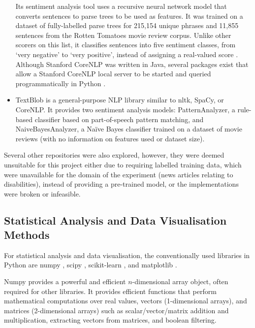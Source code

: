 \documentclass{report}
\begin{document}
\begin{itemize}
		Its sentiment analysis tool uses a recursive neural network model that converts sentences to parse trees to be used as features. 
		It was trained on a dataset of fully-labelled parse trees for 215,154 unique phrases and 11,855 sentences from the Rotten Tomatoes movie review corpus. 
		Unlike other scorers on this list, it classifies sentences into five sentiment classes, from `very negative' to `very positive', instead of assigning a real-valued score \cite{socher2013recursive}.
		Although Stanford CoreNLP was written in Java, several packages exist that allow a Stanford CoreNLP local server to be started and queried programmatically in Python \cite{stanfordcorenlp}.
	\item TextBlob \cite{textblob} is a general-purpose NLP library similar to nltk, SpaCy, or CoreNLP.
		It provides two sentiment analysis models: PatternAnalyzer, a rule-based classifier based on part-of-speech pattern matching, and NaiveBayesAnalyzer, a Na\"{i}ve Bayes classifier trained on a dataset of movie reviews (with no information on features used or dataset size). 
\end{itemize}

Several other repositories were also explored, however, they were deemed unsuitable for this project either due to requiring labelled training data, which were unavailable for the domain of the experiment (news articles relating to disabilities), instead of providing a pre-trained model, or the implementations were broken or infeasible.

\subsection{Statistical Analysis and Data Visualisation Methods} \label{tc-visualisation}
For statistical analysis and data visualisation, the conventionally used libraries in Python are numpy \cite{Numpy}, scipy \cite{Scipy}, scikit-learn \cite{Scikit-learn}, and matplotlib \cite{Matplotlib}.

Numpy \cite{Numpy} provides a powerful and efficient $n$-dimensional array object, often required for other libraries.
It provides efficient functions that perform mathematical computations over real values, vectors (1-dimensional arrays), and matrices (2-dimensional arrays) such as scalar/vector/matrix addition and multiplication, extracting vectors from matrices, and boolean filtering.
\end{document}
